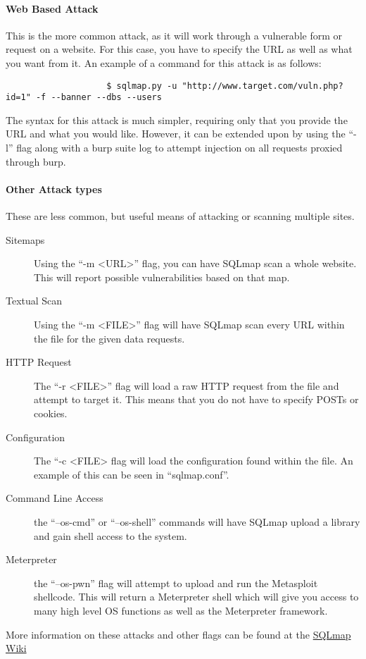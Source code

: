 			\paragraph{Web Based Attack}
				This is the more common attack, as it will work through a vulnerable form or request on a website.
				For this case, you have to specify the URL as well as what you want from it.
				An example of a command for this attack is as follows:
				\begin{verbatim}
					$ sqlmap.py -u "http://www.target.com/vuln.php?id=1" -f --banner --dbs --users
				\end{verbatim}

				The syntax for this attack is much simpler, requiring only that you provide the URL and what you would like.
				However, it can be extended upon by using the ``-l'' flag along with a burp suite log to attempt injection on all requests proxied through burp.

			\paragraph{Other Attack types}
				These are less common, but useful means of attacking or scanning multiple sites.
				\begin{description}
					\item[Sitemaps] Using the ``-m <URL>'' flag, you can have SQLmap scan a whole website.
						This will report possible vulnerabilities based on that map.
					\item[Textual Scan] Using the ``-m <FILE>'' flag will have SQLmap scan every URL within the file for the given data requests.
					\item[HTTP Request] The ``-r <FILE>'' flag will load a raw HTTP request from the file and attempt to target it.
						This means that you do not have to specify POSTs or cookies.
					\item[Configuration] The ``-c <FILE> flag will load the configuration found within the file.
						An example of this can be seen in ``sqlmap.conf''.
					\item[Command Line Access] the ``--os-cmd'' or ``--os-shell'' commands will have SQLmap upload a library and gain shell access to the system.
					\item[Meterpreter] the ``--os-pwn'' flag will attempt to upload and run the Metasploit shellcode.
						This will return a Meterpreter shell which will give you access to many high level OS functions as well as the Meterpreter framework.
				\end{description}
				More information on these attacks and other flags can be found at the \href{https://github.com/sqlmapproject/sqlmap/wiki}{SQLmap Wiki}
